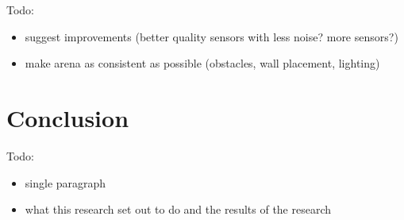 \documentclass[a4paper,12pt,twocolumn]{article}
\begin{document}
Todo:
\begin{itemize}
    \item suggest improvements (better quality sensors with less noise? more sensors?)
    \item make arena as consistent as possible (obstacles, wall placement, lighting)
\end{itemize}


\section{Conclusion}

Todo:
\begin{itemize}
    \item single paragraph
    \item what this research set out to do and the results of the research
\end{itemize}



\end{document}
